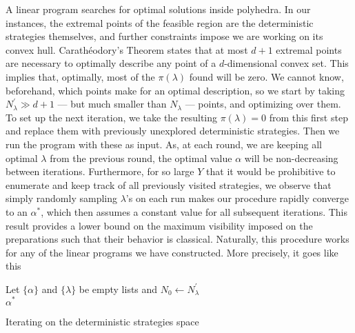 	A linear program searches for optimal solutions inside polyhedra. In our instances, the extremal points of the feasible region are the deterministic strategies themselves, and further constraints impose we are working on its convex hull. Carathéodory's Theorem \cite{rockafellar_convexanalysis_1970} states that at most $d+1$ extremal points are necessary to optimally describe any point of a $d$-dimensional convex set. This implies that, optimally, most of the $\pi(\lambda)$ found will be zero. We cannot know, beforehand, which points make for an optimal description, so we start by taking $N_\lambda^\prime \gg d+1$ --- but much smaller than $N_\lambda$ --- points, and optimizing over them. To set up the next iteration, we take the resulting $\pi(\lambda) = 0$  from this first step and replace them with previously unexplored deterministic strategies. Then we run the program with these as input. As, at each round, we are keeping all optimal $\lambda$ from the previous round, the optimal value $\alpha$ will be non-decreasing between iterations. Furthermore, for so large $Y$ that it would be prohibitive to enumerate and keep track of all previously visited strategies, we observe that simply randomly sampling $\lambda$'s on each run makes our procedure rapidly converge to an $\alpha^*$, which then assumes a constant value for all subsequent iterations. This result provides a lower bound on the maximum visibility imposed on the preparations such that their behavior is classical. Naturally, this procedure works for any of the linear programs we have constructed. More precisely, it goes like this

	\IncMargin{1em}
	\begin{algorithm}[ht!]
		\Output{$\alpha^*$}
		\BlankLine
		\nonl Let $\{ \alpha \}$ and $\{ \lambda \}$ be empty lists and $N_0 \longleftarrow N_\lambda^\prime$ \\
		\Return $\alpha^*$
		\vspace{.5em}
		\caption{Iterating on the deterministic strategies space}
		\label{algo:iterative-strategy}
	\end{algorithm}
	\DecMargin{1em}

